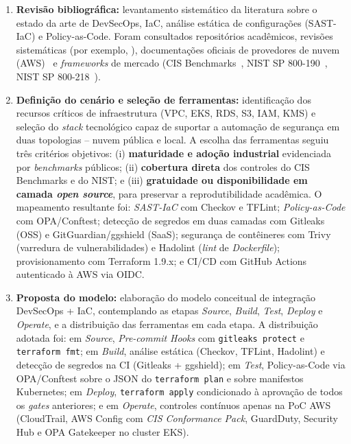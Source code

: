 \begin{enumerate}
    \item \textbf{Revisão bibliográfica:} levantamento sistemático da literatura sobre o estado da arte de DevSecOps, IaC, análise estática de configurações (SAST-IaC) e Policy-as-Code. Foram consultados repositórios acadêmicos, revisões sistemáticas (por exemplo, ), documentações oficiais de provedores de nuvem (AWS)~ e \textit{frameworks} de mercado (CIS Benchmarks~, NIST SP 800-190~, NIST SP 800-218~).

    \item \textbf{Definição do cenário e seleção de ferramentas:} identificação dos recursos críticos de infraestrutura (VPC, EKS, RDS, S3, IAM, KMS) e seleção do \textit{stack} tecnológico capaz de suportar a automação de segurança em duas topologias -- nuvem pública e local. A escolha das ferramentas seguiu três critérios objetivos: (i) \textbf{maturidade e adoção industrial} evidenciada por \textit{benchmarks} públicos; (ii) \textbf{cobertura direta} dos controles do CIS Benchmarks e do NIST; e (iii) \textbf{gratuidade ou disponibilidade em camada \textit{open source}}, para preservar a reprodutibilidade acadêmica. O mapeamento resultante foi: \textit{SAST-IaC} com Checkov e TFLint; \textit{Policy-as-Code} com OPA/Conftest; detecção de segredos em duas camadas com Gitleaks (OSS) e GitGuardian/ggshield (SaaS); segurança de contêineres com Trivy (varredura de vulnerabilidades) e Hadolint (\textit{lint} de \textit{Dockerfile}); provisionamento com Terraform 1.9.x; e CI/CD com GitHub Actions autenticado à AWS via OIDC.

    \item \textbf{Proposta do modelo:} elaboração do modelo conceitual de integração DevSecOps + IaC, contemplando as etapas \textit{Source}, \textit{Build}, \textit{Test}, \textit{Deploy} e \textit{Operate}, e a distribuição das ferramentas em cada etapa. A distribuição adotada foi: em \textit{Source}, \textit{Pre-commit Hooks} com \texttt{gitleaks protect} e \texttt{terraform fmt}; em \textit{Build}, análise estática (Checkov, TFLint, Hadolint) e detecção de segredos na CI (Gitleaks + ggshield); em \textit{Test}, Policy-as-Code via OPA/Conftest sobre o JSON do \texttt{terraform plan} e sobre manifestos Kubernetes; em \textit{Deploy}, \texttt{terraform apply} condicionado à aprovação de todos os \textit{gates} anteriores; e em \textit{Operate}, controles contínuos apenas na PoC AWS (CloudTrail, AWS Config com \textit{CIS Conformance Pack}, GuardDuty, Security Hub e OPA Gatekeeper no cluster EKS).


\end{enumerate}
